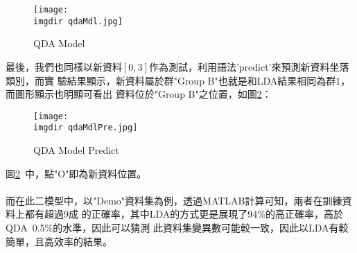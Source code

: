			\begin{figure}[H]	
		 		\centering	 			 	 
   				\texttt{[image: \\imgdir qdaMdl.jpg]} 
   			 	\caption{QDA Model}   		
   			 	\label{fig:qdaMdl}   			 		 
			\end{figure}
 			最後，我們也同樣以新資料$[0,3]$作為測試，利用語法'predict'來預測新資料坐落類別，而實				驗結果顯示，新資料屬於群"Group B"也就是和LDA結果相同為群$1$，而圖形顯示也明顯可看出				資料位於"Group B"之位置，如圖\ref{fig:qdaMdlPre}：
 			\begin{figure}[H]	
		 		\centering	 			 	 
   				\texttt{[image: \\imgdir qdaMdlPre.jpg]} 
   			 	\caption{QDA Model Predict}   		
   			 	\label{fig:qdaMdlPre}   			 		 
			\end{figure}
			圖\ref{fig:qdaMdlPre}\ 中，點"O"即為新資料位置。
			\\
			\\
			而在此二模型中，以"Demo"資料集為例，透過MATLAB計算可知，兩者在訓練資料上都有超過9成				的正確率，其中LDA的方式更是展現了94\%的高正確率，高於QDA\ 0.5\%的水準，因此可以猜測				此資料集變異數可能較一致，因此以LDA有較簡單，且高效率的結果。
